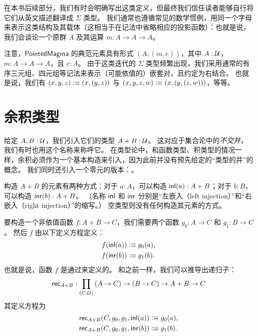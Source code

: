 在本书后续部分，我们有时会明确写出这类定义，但最终我们信任读者能够自行将它们从英文描述翻译成 $\Sigma$ 类型。
我们通常也遵循常见的数学惯例，用同一个字母来表示这类结构及其载体（这相当于在记法中省略相应的投影函数）：也就是说，我们会谈论一个原群 $A$ 及其运算 $m:A\to A\to A$。

注意，$\mathsf{PointedMagma}$ 的典范元素具有形式 $(A,(m,e))$，其中 $A:\mathcal{U}$，$m:A\to A\to A$，且 $e:A$。
由于这类迭代的 $\Sigma$ 类型频繁出现，我们采用通常的有序三元组、四元组等记法来表示（可能依值的）嵌套对，且约定为右结合。
也就是说，我们有 $(x,y,z) \vcentcolon\equiv (x,(y,z))$ 与 $(x,y,z,w)\vcentcolon\equiv (x,(y,(z,w)))$，等等。

%

\section{余积类型}
\label{sec:coproduct-types}

给定 $A,B:\mathcal{U}$，我们引入它们的类型 $A+B:\mathcal{U}$。
%
%
%
%
%
%
这对应于集合论中的\emph{不交并}，我们有时也用这个名称来称呼它。
在类型论中，和函数类型、积类型的情况一样，余积必须作为一个基本构造来引入，因为此前并没有预先给定的``类型的并''的概念。
我们同时还引入一个零元的版本：。
%
%
%

构造 $A+B$ 的元素有两种方式：对于 $a:A$，可以构造 ${\mathsf{inl}}(a) : A+B$；对于 $b:B$，可以构造 ${\mathsf{inr}}(b):A+B$。
（名称 ${\mathsf{inl}}$ 和 ${\mathsf{inr}}$ 分别是``左嵌入（left injection）''和``右嵌入（right injection）''的缩写。）
空类型则没有任何构造其元素的方式。

要构造一个非依值函数 $f : A+B \to C$，我们需要两个函数 $g_0 : A \to C$ 和 $g_1 : B \to C$。
然后 $f$ 由以下定义方程定义：
\begin{align*}
  f({\mathsf{inl}}(a)) &\vcentcolon\equiv g_0(a), \\
  f({\mathsf{inr}}(b)) &\vcentcolon\equiv g_1(b).
\end{align*}
也就是说，函数 $f$ 是通过来定义的。
%
和之前一样，我们可以推导出递归子：
%
\[ \rec{A+B} : \dprd{C:\UU}(A \to C) \to (B\to C) \to A+B \to C\]
其定义方程为
\begin{align*}
\mathsf{rec}_{A+B}(C,g_0,g_1,{\mathsf{inl}}(a)) &\vcentcolon\equiv g_0(a), \\
\mathsf{rec}_{A+B}(C,g_0,g_1,{\mathsf{inr}}(b)) &\vcentcolon\equiv g_1(b).
\end{align*}

